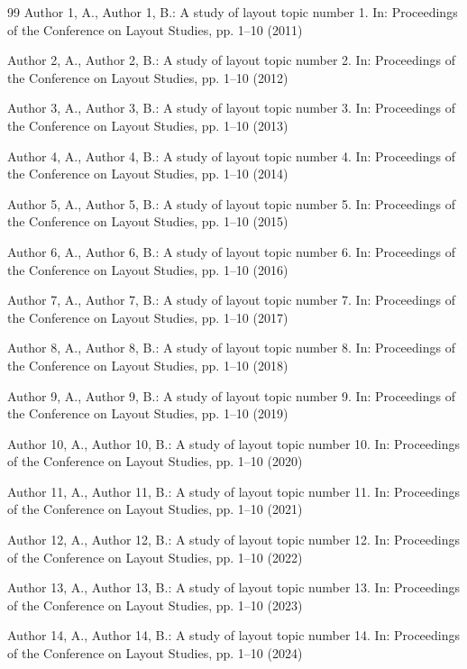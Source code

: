 \documentclass[10pt,letterpaper]{article}
\begin{document}
\begin{thebibliography}{99}
 Author 1, A., Author 1, B.: A study of layout topic number 1. In: Proceedings of the Conference on Layout Studies, pp. 1--10 (2011)

 Author 2, A., Author 2, B.: A study of layout topic number 2. In: Proceedings of the Conference on Layout Studies, pp. 1--10 (2012)

 Author 3, A., Author 3, B.: A study of layout topic number 3. In: Proceedings of the Conference on Layout Studies, pp. 1--10 (2013)

 Author 4, A., Author 4, B.: A study of layout topic number 4. In: Proceedings of the Conference on Layout Studies, pp. 1--10 (2014)

 Author 5, A., Author 5, B.: A study of layout topic number 5. In: Proceedings of the Conference on Layout Studies, pp. 1--10 (2015)

 Author 6, A., Author 6, B.: A study of layout topic number 6. In: Proceedings of the Conference on Layout Studies, pp. 1--10 (2016)

 Author 7, A., Author 7, B.: A study of layout topic number 7. In: Proceedings of the Conference on Layout Studies, pp. 1--10 (2017)

 Author 8, A., Author 8, B.: A study of layout topic number 8. In: Proceedings of the Conference on Layout Studies, pp. 1--10 (2018)

 Author 9, A., Author 9, B.: A study of layout topic number 9. In: Proceedings of the Conference on Layout Studies, pp. 1--10 (2019)

 Author 10, A., Author 10, B.: A study of layout topic number 10. In: Proceedings of the Conference on Layout Studies, pp. 1--10 (2020)

 Author 11, A., Author 11, B.: A study of layout topic number 11. In: Proceedings of the Conference on Layout Studies, pp. 1--10 (2021)

 Author 12, A., Author 12, B.: A study of layout topic number 12. In: Proceedings of the Conference on Layout Studies, pp. 1--10 (2022)

 Author 13, A., Author 13, B.: A study of layout topic number 13. In: Proceedings of the Conference on Layout Studies, pp. 1--10 (2023)

 Author 14, A., Author 14, B.: A study of layout topic number 14. In: Proceedings of the Conference on Layout Studies, pp. 1--10 (2024)


\end{thebibliography}
\end{document}
